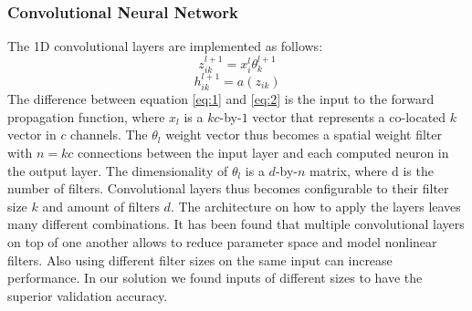 \documentclass{article}
\begin{document}
\subsubsection{Convolutional Neural Network}
\label{sssec:convolutionalneuralnetwork}
The 1D convolutional layers are implemented as follows:
\begin{equation} \label{eq:2}
z^{l+1}_{ik} = x^{l}_{i} \theta^{l+1}_{k}
\end{equation}
\begin{equation}
h^{l+1}_{ik} = a(z_{ik})
\end{equation}
The difference between equation \ref{eq:1} and \ref{eq:2} is the input to the forward propagation function, where $x_l$ is a $k c$-by-$1$ vector that represents a co-located $k$ vector in $c$ channels. The $\theta_l$ weight vector thus becomes a spatial weight filter with $n = k c$ connections between the input layer and each computed neuron in the output layer. The dimensionality of $\theta_l$ is a $d$-by-$n$ matrix, where d is the number of filters. Convolutional layers thus becomes configurable to their filter size $k$ and amount of filters $d$\cite{NIPS2012_4824}. The architecture on how to apply the layers leaves many different combinations. It has been found that multiple convolutional layers on top of one another allows to reduce parameter space and model nonlinear filters\cite{Simonyan14c}. Also using different filter sizes on the same input can increase performance\cite{sonderby2015convolutional}. In our solution we found inputs of different sizes to have the superior validation accuracy.
\end{document}
